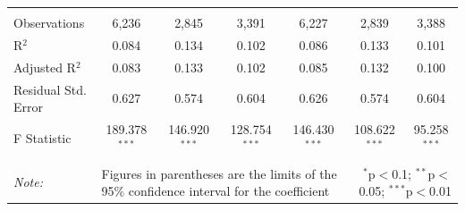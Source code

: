 \documentclass[alpha-refs]{wiley-article-01g}
\begin{document}
\begin{landscape}
\begin{table}[!htbp]
\begin{tabular}{@{\extracolsep{5pt}}lcccccc}
  & & & & & & \\ 
\hline \\[-3ex] 
Observations & 6,236 & 2,845 & 3,391 & 6,227 & 2,839 & 3,388 \\ 
R$^{2}$ & 0.084 & 0.134 & 0.102 & 0.086 & 0.133 & 0.101 \\ 
Adjusted R$^{2}$ & 0.083 & 0.133 & 0.102 & 0.085 & 0.132 & 0.100 \\ 
Residual Std. Error & 0.627 & 0.574 & 0.604 & 0.626 & 0.574 & 0.604 \\ 
F Statistic & 189.378$^{***}$ & 146.920$^{***}$ & 128.754$^{***}$ & 146.430$^{***}$ & 108.622$^{***}$ & 95.258$^{***}$ \\ 
\hline 
\hline \\[-3ex] 
\textit{Note:} &\multicolumn{4}{l}{Figures in parentheses are the limits of the 95\% confidence interval for the coefficient}  & \multicolumn{2}{r}{$^{*}$p$<$0.1; $^{**}$p$<$0.05; $^{***}$p$<$0.01} \\ 
\end{tabular} 
\end{table} 

\end{landscape}

\newpage
\end{document}
